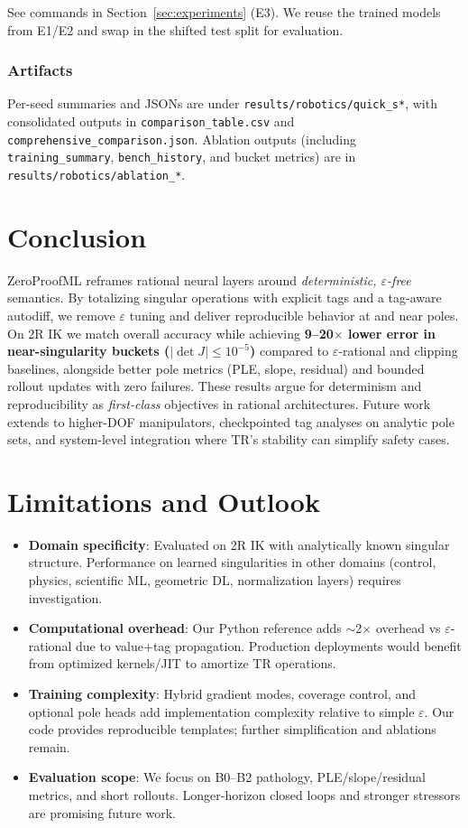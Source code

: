 \documentclass[11pt,twoside]{article}
\begin{document}
See commands in Section~\ref{sec:experiments} (E3). We reuse the trained models from E1/E2 and swap in the shifted test split for evaluation.

\subsubsection{Artifacts}

Per-seed summaries and JSONs are under \texttt{results/robotics/quick\_s*}, with consolidated outputs in \texttt{comparison\_table.csv} and \texttt{comprehensive\_comparison.json}. Ablation outputs (including \texttt{training\_summary}, \texttt{bench\_history}, and bucket metrics) are in \texttt{results/robotics/ablation\_*}.

\section{Conclusion}
ZeroProofML reframes rational neural layers around \emph{deterministic, $\varepsilon$-free} semantics. By totalizing singular operations with explicit tags and a tag-aware autodiff, we remove $\varepsilon$ tuning and deliver reproducible behavior at and near poles. On 2R IK we match overall accuracy while achieving \textbf{9--20$\times$ lower error in near-singularity buckets ($|\det J|\le10^{-5}$)} compared to $\varepsilon$-rational and clipping baselines, alongside better pole metrics (PLE, slope, residual) and bounded rollout updates with zero failures. These results argue for determinism and reproducibility as \emph{first-class} objectives in rational architectures. Future work extends to higher-DOF manipulators, checkpointed tag analyses on analytic pole sets, and system-level integration where TR's stability can simplify safety cases.

\section{Limitations and Outlook}
\begin{itemize}
  \item \textbf{Domain specificity}: Evaluated on 2R IK with analytically known singular structure. Performance on learned singularities in other domains (control, physics, scientific ML, geometric DL, normalization layers) requires investigation.
  \item \textbf{Computational overhead}: Our Python reference adds $\sim$2$\times$ overhead vs $\varepsilon$-rational due to value+tag propagation. Production deployments would benefit from optimized kernels/JIT to amortize TR operations.
  \item \textbf{Training complexity}: Hybrid gradient modes, coverage control, and optional pole heads add implementation complexity relative to simple $\varepsilon$. Our code provides reproducible templates; further simplification and ablations remain.
  \item \textbf{Evaluation scope}: We focus on B0--B2 pathology, PLE/slope/residual metrics, and short rollouts. Longer-horizon closed loops and stronger stressors are promising future work.
\end{itemize}
\end{document}
